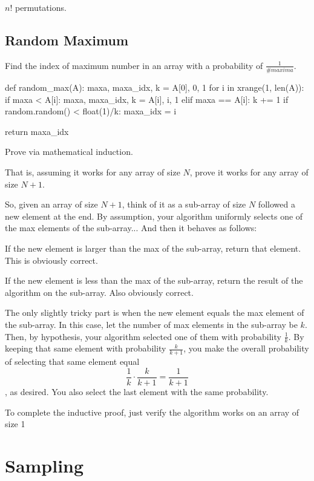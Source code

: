 
$n!$ permutations. 

\subsection{Random Maximum}
Find the index of maximum number in an array with a probability of $\frac{1}{\#maxima}$.


\begin{python}
def random_max(A):
    maxa, maxa_idx, k = A[0], 0, 1
    for i in xrange(1, len(A)):
        if maxa < A[i]:
            maxa, maxa_idx, k = A[i], i, 1
        elif maxa == A[i]:
            k += 1 
            if random.random() < float(1)/k:
                maxa_idx = i

    return maxa_idx

\end{python}
 
 Prove via mathematical induction. 

That is, assuming it works for any array of size $N$, prove it works for any array of size $N+1$.

So, given an array of size $N+1$, think of it as a sub-array of size $N$ followed a new element at the end. By assumption, your algorithm uniformly selects one of the max elements of the sub-array... And then it behaves as follows:

If the new element is larger than the max of the sub-array, return that element. This is obviously correct.

If the new element is less than the max of the sub-array, return the result of the algorithm on the sub-array. Also obviously correct.

The only slightly tricky part is when the new element equals the max element of the sub-array. In this case, let the number of max elements in the sub-array be $k$. Then, by hypothesis, your algorithm selected one of them with probability $\frac{1}{k}$. By keeping that same element with probability $\frac{k}{k+1}$, you make the overall probability of selecting that same element equal $$\frac{1}{k} \cdot \frac{k}{k+1} = \frac{1}{k+1}$$, as desired. You also select the last element with the same probability.

To complete the inductive proof, just verify the algorithm works on an array of size 1

\section{Sampling}
